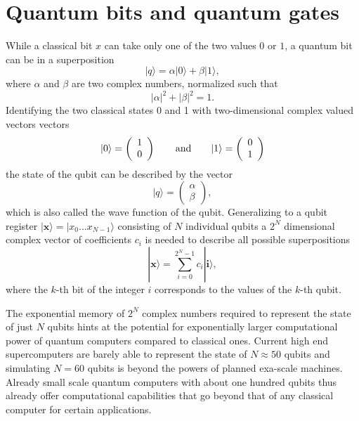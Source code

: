 \documentclass[journal]{IEEEtran}
\begin{document}
\appendices
\section{Quantum bits and quantum gates}
\label{sec:box1}
While a classical bit $x$ can take only one of the two values $0$ or $1$, a quantum bit can be in a superposition
\begin{equation}
|q\rangle = \alpha |0\rangle +\beta|1\rangle,
\end{equation}
where $\alpha$ and $\beta$ are two complex numbers, normalized such that
\begin{equation}
|\alpha|^2+|\beta|^2=1.
\end{equation}
 Identifying the two classical states 0 and 1 with two-dimensional complex valued vectors vectors 
 \begin{equation}
 |0\rangle = \left(\begin{array}{c}1\\0\end{array}\right) \qquad {\rm and} \qquad  |1\rangle = \left(\begin{array}{c}0\\1\end{array}\right)
 \end{equation}
  the state of the qubit can be described by the vector 
  \begin{equation}
  |q\rangle = \left(\begin{array}{c}\alpha\\\beta\end{array}\right),
  \end{equation} which is also called the wave function of the qubit. Generalizing to a qubit register $| \mathbf{x}\rangle=|x_0\ldots x_{N-1}\rangle$ consisting of $N$ individual qubits a $2^N$ dimensional complex vector of coefficients $c_i$ is needed to describe all possible superpositions
  \begin{equation}
  |\mathbf{x}\rangle = \sum_{i=0}^{2^N-1} c_i |\mathbf{i}\rangle,
  \end{equation}
where the $k$-th bit of the integer $i$ corresponds to the values of the $k$-th qubit.

The exponential memory of $2^N$ complex numbers required to represent the state of just $N$ qubits hints at the potential for exponentially larger computational power of quantum computers compared to classical ones. Current high end supercomputers are barely able to represent the state of $N\approx50$ qubits and simulating $N=60$ qubits is beyond the powers of planned exa-scale machines. Already small scale quantum computers with about one hundred qubits thus already offer computational capabilities that go beyond that of any classical computer for certain applications.
\end{document}
